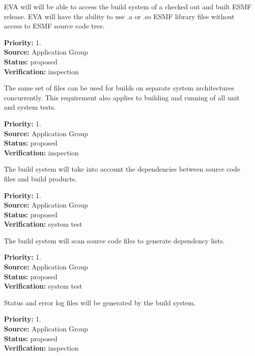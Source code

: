 EVA will will be able to access the build system
of a checked out and built  ESMF release.  EVA will
have the ability to use .a or .so ESMF library files
without access to ESMF source code tree.
\begin{reqlist}
{\bf Priority:} 1. \\
{\bf Source:} Application Group \\
{\bf Status:} proposed \\
{\bf Verification:} inspection
\end{reqlist}


The same set of files can be used for builds on separate 
system architectures concurrently.  This requirement also
applies to building and running of all unit and system
tests.
\begin{reqlist}
{\bf Priority:} 1. \\
{\bf Source:} Application Group \\
{\bf Status:} proposed \\
{\bf Verification:} inspection
\end{reqlist}

The build system will take into account the dependencies 
between source code files and build products.  
\begin{reqlist}
{\bf Priority:} 1. \\
{\bf Source:} Application Group \\
{\bf Status:} proposed \\
{\bf Verification:} system test
\end{reqlist}

The build system will scan source code files to 
generate dependency lists.
\begin{reqlist}
{\bf Priority:} 1. \\
{\bf Source:} Application Group \\
{\bf Status:} proposed \\
{\bf Verification:} system test
\end{reqlist}

Status and error log files will be generated by 
the build system.
\begin{reqlist}
{\bf Priority:} 1. \\
{\bf Source:} Application Group \\
{\bf Status:} proposed \\
{\bf Verification:} inspection
\end{reqlist}

